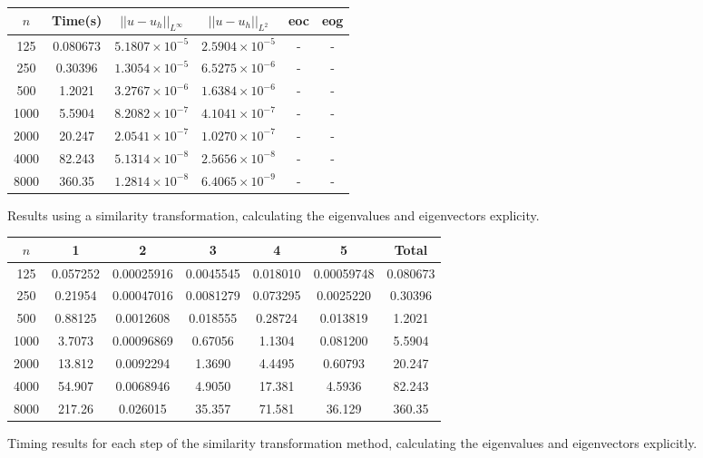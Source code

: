 \documentclass{article}
\numberwithin{equation}{section}
\begin{document}
\begin{figure}[H]
\centering
\begin{tabular}{|c|c|c|c|c|c|}
\hline
$n$ & Time(s) & $|| u - u_h ||_{L^{\infty}}$ &$|| u - u_h ||_{L^{2}}$ & eoc & eog\\
\hline
125 & 0.080673 & $5.1807 \times 10^{-5}$ & $2.5904 \times 10^{-5}$ & - & -  \\
250 & 0.30396 & $1.3054 \times 10^{-5}$ & $6.5275 \times 10^{-6}$ & - & -  \\
500 & 1.2021 & $3.2767 \times 10^{-6}$ & $1.6384 \times 10^{-6}$ & - & -  \\
1000 & 5.5904 & $8.2082 \times 10^{-7}$ & $4.1041 \times 10^{-7}$ & - & -  \\
2000 & 20.247 & $2.0541 \times 10^{-7}$ & $1.0270 \times 10^{-7}$ & - & -  \\
4000 & 82.243 & $5.1314 \times 10^{-8}$ & $2.5656 \times 10^{-8}$ & - & -  \\
8000 & 360.35 & $1.2814 \times 10^{-8}$ & $6.4065 \times 10^{-9}$ & - & -  \\
\hline
\end{tabular}
\captionsetup{justification=centering}
\caption{Results using a similarity transformation, calculating the eigenvalues and eigenvectors explicity.}
\end{figure}

\begin{figure}[H]
\centering
\begin{tabular}{|c|c|c|c|c|c|c|}
\hline
$n$ & 1 & 2 & 3 & 4 & 5 & Total \\
\hline
125 & 0.057252 & 0.00025916 & 0.0045545 & 0.018010 & 0.00059748 & 0.080673 \\
250 & 0.21954 & 0.00047016 & 0.0081279 & 0.073295 & 0.0025220 & 0.30396 \\ 
500 & 0.88125 & 0.0012608 & 0.018555 & 0.28724 & 0.013819 & 1.2021  \\
1000 & 3.7073 & 0.00096869 & 0.67056 & 1.1304 & 0.081200 & 5.5904 \\
2000 & 13.812 & 0.0092294 & 1.3690 & 4.4495 & 0.60793 & 20.247 \\
4000 & 54.907 & 0.0068946 & 4.9050 & 17.381 & 4.5936 & 82.243 \\
8000 & 217.26 & 0.026015 & 35.357 & 71.581 & 36.129 & 360.35 \\
\hline
\end{tabular}
\captionsetup{justification=centering}
\caption{Timing results for each step of the similarity transformation method, calculating the eigenvalues and eigenvectors explicitly.}
\end{figure}
\end{document}

